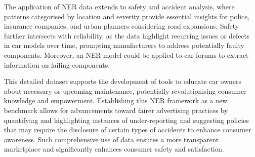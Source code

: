 \documentclass[11pt]{article}
\begin{document}
The application of NER data extends to safety and accident analysis, where patterns categorised by location and severity provide essential insights for police, insurance companies, and urban planners considering road expansions. Safety further intersects with reliability, as the data highlight recurring issues or defects in car models over time, prompting manufacturers to address potentially faulty components. Moreover, an NER model could be applied to car forums to extract information on failing components.

This detailed dataset supports the development of tools to educate car owners about necessary or upcoming maintenance, potentially revolutionising consumer knowledge and empowerment. Establishing this NER framework as a new benchmark allows for advancements toward fairer advertising practices by quantifying and highlighting instances of under-reporting and suggesting policies that may require the disclosure of certain types of accidents to enhance consumer awareness. Such comprehensive use of data ensures a more transparent marketplace and significantly enhances consumer safety and satisfaction.





\end{document}
